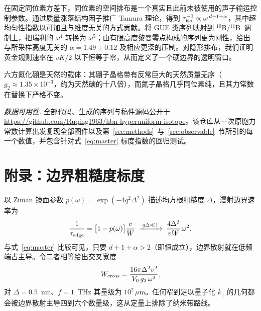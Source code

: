 \documentclass[10pt,twocolumn]{article}
\newcommand{\tenB}{$^{10}$B}
\newcommand{\elevenB}{$^{11}$B}
\begin{document}
在固定同位素方差下，同位素的空间排布是一个真实且此前未被使用的声子输运控制参数。通过质量涨落结构因子推广 Tamura 理论，得到 $\tau_{\rm iso}^{-1}\propto\omega^{\,d+1+\alpha}$，其中超均匀性指数以可加且与维度无关的方式贡献。将 GUE 类序列映射到 \tenB/\elevenB\ 调制上，把瑞利的 $\omega^{4}$ 转换为 $\omega^{5}$；由有限高度黎曼零点构成的序列更为刚性，给出与所采样高度无关的 $\alpha=1.49\pm0.12$ 及相应更深的压制。对隐形排布，我们证明黄金规则速率在 $vK/2$ 以下恒等于零，从而定义了一个硬边界的透明窗口。

六方氮化硼是天然的载体：其硼子晶格带有反常巨大的天然质量无序（$g_2\approx1.35\times10^{-3}$，约为天然碳的十八倍），而氮子晶格几乎同位素纯，且其力常数在替换下严格不变。

\medskip\noindent
\emph{数据可用性.} 全部代码、生成的序列与稿件源码公开于 \url{https://github.com/Ruqing1963/hbn-hyperuniform-isotope}。该仓库从一次原胞力常数计算出发复现全部图件以及第~\ref{sec:methods}~与~\ref{sec:observable}~节所引的每一个数值，并包含针对式~\eqref{eq:master} 标度指数的回归测试。


\section*{附录：边界粗糙度标度}
\setcounter{equation}{0}
\renewcommand{\theequation}{A\arabic{equation}}

以 Ziman 镜面参数 $p(\omega)=\exp(-4q^{2}\Delta^{2})$ 描述均方根粗糙度 $\Delta$，漫射边界速率为
\begin{equation}
  \frac{1}{\tau_{\rm edge}}=\big[1-p(\omega)\big]\frac{v}{W}
  \;\xrightarrow{\;q\Delta\ll1\;}\;
  \frac{4\Delta^{2}}{vW}\,\omega^{2}.
  \label{eq:edge}
\end{equation}
与式~\eqref{eq:master} 比较可见，只要 $d+1+\alpha>2$（即恒成立），边界散射就在低频端占主导。令二者相等给出交叉宽度
\begin{equation}
  W_{\rm cross}=\frac{16\pi\Delta^{2}v^{2}}{V_0\,g_2\,\omega^{2}},
  \label{eq:wcross}
\end{equation}
对 $\Delta=0.5$~nm、$f=1$~THz 其量级为 $10^{2}\,\mu$m。任何窄到足以量子化 $k_\parallel$ 的几何都会被边界散射主导四到六个数量级，这从定量上排除了纳米带路线。
\end{document}
